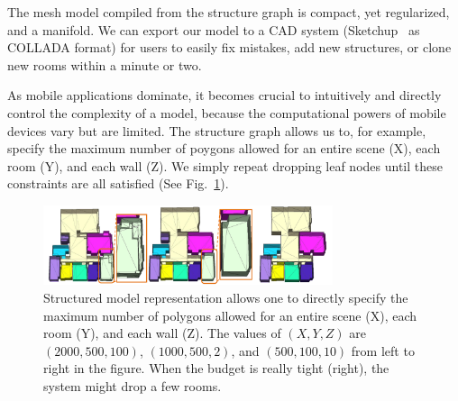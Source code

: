  The mesh model compiled from the structure
graph is compact, yet regularized, and a manifold. We can export our
model to a CAD system (\eg Sketchup~\cite{sketchup} as COLLADA format)
for users to easily fix mistakes, add new structures, or clone new rooms
within a minute or two.

 As mobile applications
dominate, it becomes crucial to intuitively and directly control the
complexity of a model, because the computational powers of mobile
devices vary but are limited.
The structure graph allows us to,
for example, specify the maximum number of poygons allowed for an entire
scene (X), each room (Y), and each wall (Z). We simply repeat dropping
leaf nodes until these constraints are all satisfied (See
Fig.~\ref{fig:complexity_control}).
\begin{figure}[!t]
\begin{center}
\includegraphics[width=85mm]{../figures/complexity2.pdf}
\end{center}
 \vspace{-0.2cm}
\caption{Structured model representation allows one to
 directly specify the
 maximum number of polygons allowed for an entire scene (X), each room
 (Y), and each wall (Z). The values of $(X,Y,Z)$ are $(2000,500,100)$,
 $(1000, 500, 2)$, and $(500, 100, 10)$ from left to right in the figure.
 When the budget is really tight (right), the
 system might drop a few rooms. %
 }
\label{fig:complexity_control}
 \vspace{-0.25cm}
\end{figure}

